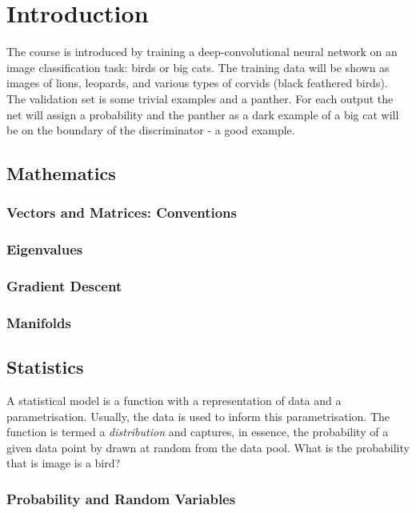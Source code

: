 \documentclass[12pt]{book}
\begin{document}
\tableofcontents


\chapter{Introduction}
The course is introduced by training a deep-convolutional neural network on an image classification task: birds or big cats. The training data will be shown as images of lions, leopards, and various types of corvids (black feathered birds). The validation set is some trivial examples and a panther. For each output the net will assign a probability and the panther as a dark example of a big cat will be on the boundary of the discriminator - a good example.

\newpage
\section{Mathematics}

\subsection{Vectors and Matrices: Conventions}

\subsection{Eigenvalues}

\subsection{Gradient Descent}

\subsection{Manifolds}

\section{Statistics}
A statistical model is a function with a representation of data and a parametrisation. Usually, the data is used to inform this parametrisation. The function is termed a 
\textit{distribution} and captures, in essence, the probability of a given data point by drawn at random from the data pool. What is the probability that is image is a bird?

\subsection{Probability and Random Variables}
\end{document}

